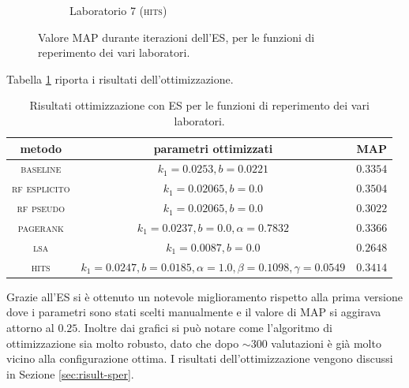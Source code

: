 \begin{figure}[H]
\begin{subfigure}{0.475\textwidth}
            \caption[]%
            {{\small Laboratorio 7 (\textsc{hits})}}    
            \label{fig:es_lab7}
        \end{subfigure}
        \caption[ The average and standard deviation of critical parameters ]
        {\small Valore MAP durante iterazioni dell'ES, per le funzioni di reperimento dei vari laboratori.} 
        \label{fig:es_all}
\end{figure}

Tabella \ref{tab:es} riporta i risultati dell'ottimizzazione.
\begin{table}[htpb]
\begin{center}
\begin{tabular}{|c|c|c|}
\hline
metodo & parametri ottimizzati & MAP \\
 \hline
\textsc{baseline} & $k_1 = 0.0253, b = 0.0221$ & $0.3354$ \\
\textsc{rf esplicito}  & $k_1 = 0.02065, b = 0.0$ & $0.3504$ \\
\textsc{rf pseudo}  & $k_1 = 0.02065, b = 0.0$ & $0.3022$ \\
\textsc{pagerank} & $k_1 = 0.0237, b = 0.0, \alpha=0.7832$ & $0.3366$ \\
\textsc{lsa} & $k_1 = 0.0087, b = 0.0$ & $0.2648$ \\
\textsc{hits} & $k_1 = 0.0247, b = 0.0185, \alpha=1.0, \beta=0.1098, \gamma=0.0549$ & $0.3414$ \\
\hline
\end{tabular}
\end{center}
\caption{Risultati ottimizzazione con ES per le funzioni di reperimento dei vari laboratori.}
\label{tab:es}
\end{table}

Grazie all'ES si \`e ottenuto un notevole miglioramento rispetto alla prima versione dove i parametri sono stati scelti manualmente e il valore di MAP si aggirava attorno al $0.25$. Inoltre dai grafici si pu\`o notare come l'algoritmo di ottimizzazione sia molto robusto, dato che dopo $\sim{300}$ valutazioni \`e gi\`a  molto vicino alla configurazione ottima. I risultati dell'ottimizzazione vengono discussi in Sezione \ref{sec:risult-sper}.


